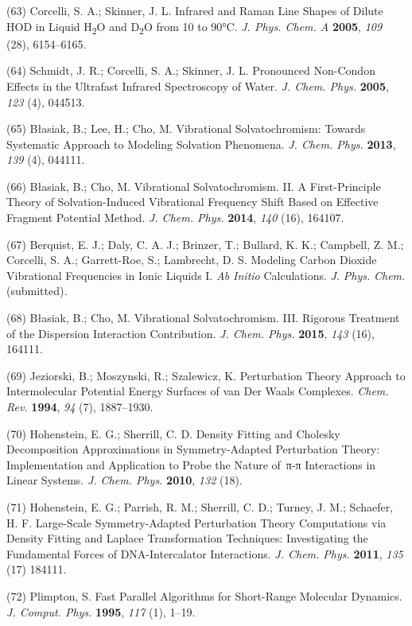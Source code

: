 \documentclass[]{article}
\begin{document}
(63) Corcelli, S. A.; Skinner, J. L. Infrared and Raman Line Shapes of
Dilute HOD in Liquid H\textsubscript{2}O and D\textsubscript{2}O from 10
to 90°C. \emph{J. Phys. Chem. A} \textbf{2005}, \emph{109} (28),
6154--6165.

(64) Schmidt, J. R.; Corcelli, S. A.; Skinner, J. L. Pronounced
Non-Condon Effects in the Ultrafast Infrared Spectroscopy of Water.
\emph{J. Chem. Phys.} \textbf{2005}, \emph{123} (4), 044513.

(65) Błasiak, B.; Lee, H.; Cho, M. Vibrational Solvatochromism: Towards
Systematic Approach to Modeling Solvation Phenomena. \emph{J. Chem.
Phys.} \textbf{2013}, \emph{139} (4), 044111.

(66) Błasiak, B.; Cho, M. Vibrational Solvatochromism. II. A
First-Principle Theory of Solvation-Induced Vibrational Frequency Shift
Based on Effective Fragment Potential Method. \emph{J. Chem. Phys.}
\textbf{2014}, \emph{140} (16), 164107.

(67) Berquist, E. J.; Daly, C. A. J.; Brinzer, T.; Bullard, K. K.;
Campbell, Z. M.; Corcelli, S. A.; Garrett-Roe, S.; Lambrecht, D. S.
Modeling Carbon Dioxide Vibrational Frequencies in Ionic Liquids I.
\emph{Ab Initio} Calculations. \emph{J.} \emph{Phys.} \emph{Chem.}
(submitted)\emph{.}

(68) Błasiak, B.; Cho, M. Vibrational Solvatochromism. III. Rigorous
Treatment of the Dispersion Interaction Contribution. \emph{J. Chem.
Phys.} \textbf{2015}, \emph{143} (16), 164111.

(69) Jeziorski, B.; Moszynski, R.; Szalewicz, K. Perturbation Theory
Approach to Intermolecular Potential Energy Surfaces of van Der Waals
Complexes. \emph{Chem. Rev.} \textbf{1994}, \emph{94} (7), 1887--1930.

(70) Hohenstein, E. G.; Sherrill, C. D. Density Fitting and Cholesky
Decomposition Approximations in Symmetry-Adapted Perturbation Theory:
Implementation and Application to Probe the Nature of\, π-π Interactions
in Linear Systems. \emph{J. Chem. Phys.} \textbf{2010}, \emph{132} (18).

(71) Hohenstein, E. G.; Parrish, R. M.; Sherrill, C. D.; Turney, J. M.;
Schaefer, H. F. Large-Scale Symmetry-Adapted Perturbation Theory
Computations via Density Fitting and Laplace Transformation Techniques:
Investigating the Fundamental Forces of DNA-Intercalator Interactions.
\emph{J. Chem. Phys.} \textbf{2011}, \emph{135} (17) 184111.

(72) Plimpton, S. Fast Parallel Algorithms for Short-Range Molecular
Dynamics. \emph{J. Comput. Phys.} \textbf{1995}, \emph{117} (1), 1--19.
\end{document}

